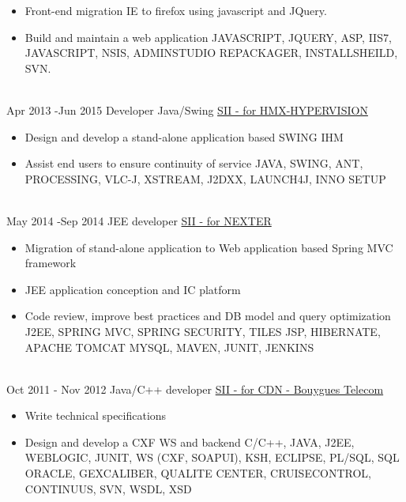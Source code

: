 \documentclass[letterpaper]{twentysecondcv} %
\begin{document}
\begin{twenty}
{{\begin{itemize}
		\item Front-end migration IE to firefox using javascript and JQuery.
		\item Build and maintain a web application
		 \medskip   \newline \footnotesize  JAVASCRIPT, JQUERY, ASP, IIS7, JAVASCRIPT, NSIS, ADMINSTUDIO REPACKAGER, INSTALLSHEILD, SVN.
    	\end{itemize}}
        }
     \\
     \twentyitem
   	{Apr 2013 -}{Jun 2015}
        {Developer Java/Swing}
        {\href{}{SII - for HMX-HYPERVISION}}
        {}
        {
       	 \begin{itemize}
        	\item  Design and develop a stand-alone application based SWING IHM
       		\item Assist end users to ensure continuity of service
	 \medskip   \newline \footnotesize  JAVA, SWING, ANT, PROCESSING, VLC-J, XSTREAM, J2DXX, LAUNCH4J, INNO SETUP	
    	\end{itemize}	
    	}
	\\   
	\twentyitem
	{May 2014 -}{Sep 2014}
	{JEE developer}
	{\href{https://www.nexter-group.fr/}{SII - for NEXTER}}
	{}
	{
	\begin{itemize}
		\item Migration of stand-alone application to Web application based Spring MVC framework 
		\item JEE application conception and IC platform
		\item Code review, improve best practices and DB model and query optimization  
	\medskip   \newline \footnotesize  J2EE, SPRING MVC, SPRING SECURITY, TILES JSP, HIBERNATE, APACHE TOMCAT MYSQL, MAVEN, JUNIT, JENKINS
	\end{itemize}
	}       
       \\
	\twentyitem
	{Oct 2011 -}  {Nov 2012}
	 {Java/C++ developer}
	{\href{https://www.jobs.bouyguestelecom.fr/}{SII - for CDN - Bouygues Telecom}}
	{}
	 {
	   \begin{itemize}
	    	\item Write technical specifications
	    	\item Design and develop a CXF WS and backend
		 \medskip   \newline\footnotesize   C/C++, JAVA, J2EE, WEBLOGIC, JUNIT, WS (CXF, SOAPUI), KSH, ECLIPSE, PL/SQL, SQL ORACLE, GEXCALIBER, QUALITE CENTER, CRUISECONTROL, CONTINUUS, SVN, WSDL, XSD

\end{itemize}}
\end{twenty}
\end{document}

